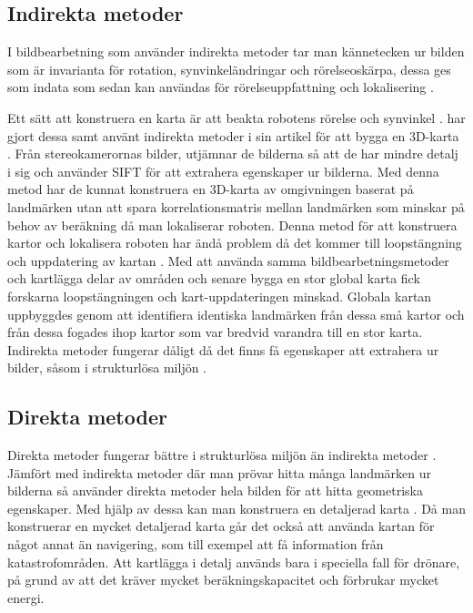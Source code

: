 \subsection{Indirekta metoder}

I bildbearbetning som använder indirekta metoder tar man kännetecken ur bilden som är invarianta för rotation, synvinkeländringar och rörelseoskärpa, dessa ges som indata som sedan kan användas för rörelseuppfattning och lokalisering \citep{geospatial}. 

Ett sätt att konstruera en karta är att beakta robotens rörelse och synvinkel \citep{globalsubmaps}. \cite{mapbuildingsift} har gjort dessa samt använt indirekta metoder i sin artikel  för att bygga en 3D-karta \citep{mapbuildingsift}. Från stereokamerornas bilder, utjämnar de bilderna så att de har mindre detalj i sig och använder SIFT för att extrahera egenskaper ur bilderna. Med denna metod har de kunnat konstruera en 3D-karta av omgivningen baserat på landmärken utan att spara korrelationsmatris mellan landmärken som minskar på behov av beräkning då man lokaliserar roboten. Denna metod för att konstruera kartor och lokalisera roboten har ändå problem då det kommer till loopstängning och uppdatering av kartan \citep{globalsubmaps}. Med att använda samma bildbearbetningsmetoder och kartlägga delar av områden och senare bygga en stor global karta fick forskarna loopstängningen och kart-uppdateringen minskad. Globala kartan uppbyggdes genom att identifiera identiska landmärken från dessa små kartor och från dessa fogades ihop kartor som var bredvid varandra till en stor karta. Indirekta metoder fungerar dåligt då det finns få egenskaper att extrahera ur bilder, såsom i strukturlösa miljön \citep{geospatial}.

\subsection{Direkta metoder}

Direkta metoder fungerar bättre i strukturlösa miljön än indirekta metoder \citep{Engel2014LSDSLAMLD}. Jämfört med indirekta metoder där man prövar hitta många landmärken ur bilderna så använder direkta metoder hela bilden för att hitta geometriska egenskaper. Med hjälp av dessa kan man konstruera en detaljerad karta \citep{geospatial}. Då man konstruerar en mycket detaljerad karta går det också att använda kartan för något annat än navigering, som till exempel att få information från katastrofområden. Att kartlägga i detalj används bara i speciella fall för drönare, på grund av att det kräver mycket beräkningskapacitet och förbrukar mycket energi.

